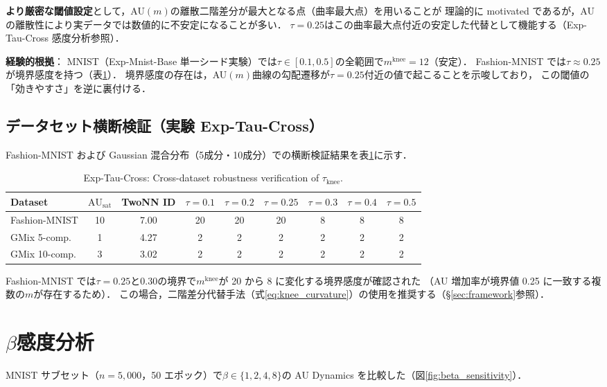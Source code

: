\documentclass[11pt,a4paper]{jsarticle}
\newcommand{\AUsat}{\mathrm{AU}_{\mathrm{sat}}}
\newcommand{\mknee}{m^{\mathrm{knee}}}
\begin{document}
\textbf{より厳密な閾値設定}として，AU$(m)$の離散二階差分が最大となる点（曲率最大点）を用いることが
理論的に motivated であるが，AU の離散性により実データでは数値的に不安定になることが多い．
$\tau = 0.25$はこの曲率最大点付近の安定した代替として機能する（Exp-Tau-Cross 感度分析参照）．

\textbf{経験的根拠}：
MNIST（Exp-Mnist-Base 単一シード実験）では$\tau \in [0.1, 0.5]$の全範囲で$\mknee = 12$（安定）．
Fashion-MNIST では$\tau \approx 0.25$が境界感度を持つ（表\ref{tab:ez}）．
境界感度の存在は，AU$(m)$曲線の勾配遷移が$\tau = 0.25$付近の値で起こることを示唆しており，
この閾値の「効きやすさ」を逆に裏付ける．

\subsection*{データセット横断検証（実験 Exp-Tau-Cross）}

Fashion-MNIST および Gaussian 混合分布（5成分・10成分）での横断検証結果を表\ref{tab:ez}に示す．

\begin{table}[H]
\centering
\caption{Exp-Tau-Cross: Cross-dataset robustness verification of $\tau_{\mathrm{knee}}$.}
\label{tab:ez}
\small
\begin{tabular}{lcc|cccccc}
\toprule
Dataset & $\AUsat$ & TwoNN ID & $\tau=0.1$ & $\tau=0.2$ & $\tau=0.25$ & $\tau=0.3$ & $\tau=0.4$ & $\tau=0.5$ \\
\midrule
Fashion-MNIST & 10 & 7.00 & 20 & 20 & 20 & 8 & 8 & 8 \\
GMix 5-comp. & 1 & 4.27 & 2 & 2 & 2 & 2 & 2 & 2 \\
GMix 10-comp. & 3 & 3.02 & 2 & 2 & 2 & 2 & 2 & 2 \\
\bottomrule
\end{tabular}
\end{table}

Fashion-MNIST では$\tau = 0.25$と$0.30$の境界で$\mknee$が 20 から 8 に変化する境界感度が確認された
（AU 増加率が境界値 0.25 に一致する複数の$m$が存在するため）．
この場合，二階差分代替手法（式\eqref{eq:knee_curvature}）の使用を推奨する（§\ref{sec:framework}参照）．

\section{$\beta$感度分析}\label{app:beta}

MNIST サブセット（$n = 5{,}000$，50 エポック）で$\beta \in \{1, 2, 4, 8\}$の AU Dynamics を比較した（図\ref{fig:beta_sensitivity}）．
\end{document}
